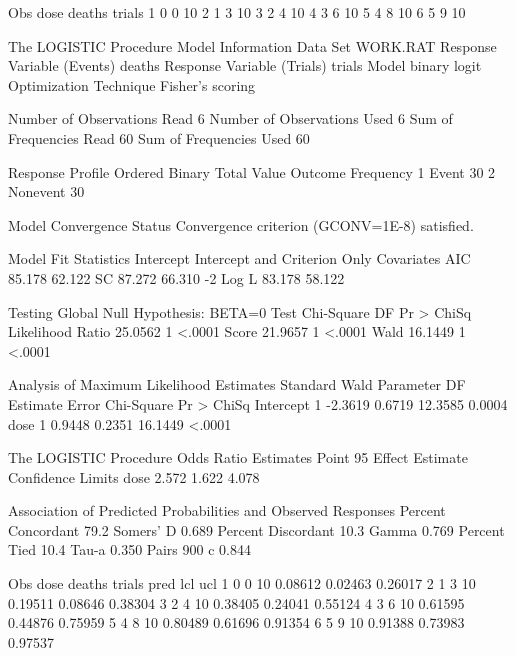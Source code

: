 \documentclass{article}
\begin{document}
\begin{Woutput}
Obs    dose    deaths    trials
 1       0        0        10
 2       1        3        10
 3       2        4        10
 4       3        6        10
 5       4        8        10
 6       5        9        10

The LOGISTIC Procedure
               Model Information
Data Set                       WORK.RAT
Response Variable (Events)     deaths
Response Variable (Trials)     trials
Model                          binary logit
Optimization Technique         Fisher's scoring

Number of Observations Read           6
Number of Observations Used           6
Sum of Frequencies Read              60
Sum of Frequencies Used              60

          Response Profile
 Ordered     Binary           Total
   Value     Outcome      Frequency
       1     Event               30
       2     Nonevent            30

                    Model Convergence Status
         Convergence criterion (GCONV=1E-8) satisfied.

         Model Fit Statistics
                             Intercept
              Intercept            and
Criterion          Only     Covariates
AIC              85.178         62.122
SC               87.272         66.310
-2 Log L         83.178         58.122

        Testing Global Null Hypothesis: BETA=0
Test                 Chi-Square       DF     Pr > ChiSq
Likelihood Ratio        25.0562        1         <.0001
Score                   21.9657        1         <.0001
Wald                    16.1449        1         <.0001

             Analysis of Maximum Likelihood Estimates
                               Standard          Wald
Parameter    DF    Estimate       Error    Chi-Square    Pr > ChiSq
Intercept     1     -2.3619      0.6719       12.3585        0.0004
dose          1      0.9448      0.2351       16.1449        <.0001

The LOGISTIC Procedure
           Odds Ratio Estimates
             Point          95%
Effect    Estimate      Confidence Limits
dose         2.572       1.622       4.078

Association of Predicted Probabilities and Observed Responses
Percent Concordant     79.2    Somers' D    0.689
Percent Discordant     10.3    Gamma        0.769
Percent Tied           10.4    Tau-a        0.350
Pairs                   900    c            0.844

Obs    dose    deaths    trials      pred       lcl        ucl
 1       0        0        10      0.08612    0.02463    0.26017
 2       1        3        10      0.19511    0.08646    0.38304
 3       2        4        10      0.38405    0.24041    0.55124
 4       3        6        10      0.61595    0.44876    0.75959
 5       4        8        10      0.80489    0.61696    0.91354
 6       5        9        10      0.91388    0.73983    0.97537
\end{Woutput}
\end{document}
